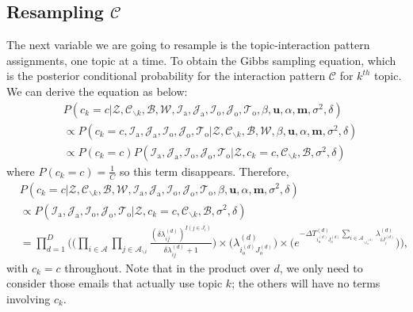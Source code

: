 \documentclass[a4paper]{article}
\begin{document}
 \subsection{Resampling $\mathcal{C}$} \label{subsec: Resampling C}
 The next variable we are going to resample is the topic-interaction pattern assignments, one topic at a time. To obtain the Gibbs sampling equation, which is the posterior conditional probability for the interaction pattern $\mathcal{C}$ for $k^{th}$ topic. We can derive the equation as below:
 \begin{equation}
 \begin{aligned} & P(c_k=c|\mathcal{Z},   \mathcal{C}_{\backslash k},   \mathcal{B},\mathcal{W}, \mathcal{I}_{\mbox{a}}, \mathcal{J}_{\mbox{a}}, \mathcal{I}_{\mbox{o}}, \mathcal{J}_{\mbox{o}}, \mathcal{T}_{\mbox{o}}, \beta, \boldsymbol{u}, \alpha, \boldsymbol{m}, \sigma^2,  \delta)\\
 &\propto P(c_k=c, \mathcal{I}_{\mbox{a}}, \mathcal{J}_{\mbox{a}}, \mathcal{I}_{\mbox{o}}, \mathcal{J}_{\mbox{o}}, \mathcal{T}_{\mbox{o}}|\mathcal{Z}, \mathcal{C}_{\backslash k},   \mathcal{B},\mathcal{W}, \beta, \boldsymbol{u}, \alpha, \boldsymbol{m}, \sigma^2, \delta)\\
& \propto P(c_k=c)P(\mathcal{I}_{\mbox{a}}, \mathcal{J}_{\mbox{a}}, \mathcal{I}_{\mbox{o}}, \mathcal{J}_{\mbox{o}}, \mathcal{T}_{\mbox{o}}| \mathcal{Z}, c_k=c, \mathcal{C}_{\backslash k}, \mathcal{B}, \sigma^2, \delta)
 \end{aligned}
 \end{equation}
 where $P(c_k=c) = \frac{1}{C}$ so this term disappears. Therefore, 
 \begin{equation}
 \begin{aligned}
 &P(c_k=c|\mathcal{Z},   \mathcal{C}_{\backslash k},   \mathcal{B},\mathcal{W}, \mathcal{I}_{\mbox{a}}, \mathcal{J}_{\mbox{a}}, \mathcal{I}_{\mbox{o}}, \mathcal{J}_{\mbox{o}}, \mathcal{T}_{\mbox{o}}, \beta, \boldsymbol{u}, \alpha, \boldsymbol{m}, \sigma^2, \delta)\\&\propto P(\mathcal{I}_{\mbox{a}}, \mathcal{J}_{\mbox{a}}, \mathcal{I}_{\mbox{o}}, \mathcal{J}_{\mbox{o}}, \mathcal{T}_{\mbox{o}}| \mathcal{Z}, c_k=c, \mathcal{C}_{\backslash k}, \mathcal{B}, \sigma^2,  \delta)\\&=\prod_{d=1}^D\Bigg(\Big(\prod_{i\in \mathcal{A}}\prod_{j \in \mathcal{A}_{\backslash i }} \frac{(\delta\lambda^{(d)}_{ij})^{I(j \in J_i)}}{\delta\lambda^{(d)}_{ij}+1}\Big)\times \Big(\lambda^{(d)}_{i_o^{(d)}J_{o}^{(d)}}\Big)\times  \Big(e^{-\Delta T^{(d)}_{i_o^{(d)}J_o^{(d)}}\sum\limits_{i\in \mathcal{A}_{\backslash i_o^{(d)}}}\lambda^{(d)}_{iJ^{(d)}_{i}}}\Big)\Bigg),
 \end{aligned}
 \end{equation} 
 with $c_k=c$ throughout. Note that in the product over $d$, we only need to consider those emails that actually use topic $k$; the others will have no terms involving $c_k$.
\end{document}
